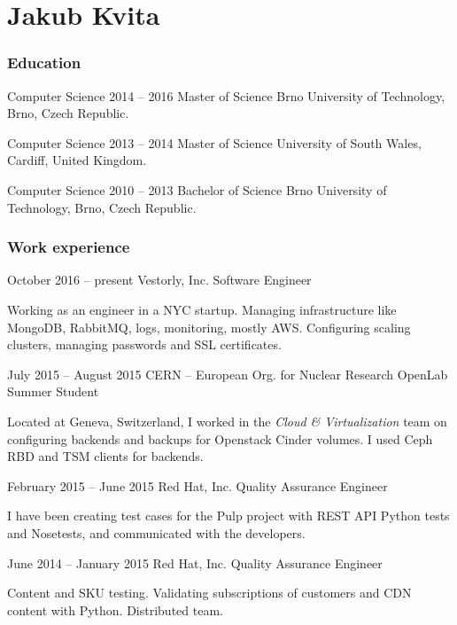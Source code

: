 \documentclass{tccv}
\begin{document}
\part{Jakub Kvita}

\section{Education}

\begin{yearlist}
	
	\item[Computer Science]{2014 -- 2016}
	{Master of Science}
	{Brno University of Technology, Brno, Czech Republic.}
	
	\item[Computer Science]{2013 -- 2014}
	{Master of Science}
	{University of South Wales, Cardiff, United Kingdom.}
	
	\item[Computer Science]{2010 -- 2013}
	{Bachelor of Science}
	{Brno University of Technology, Brno, Czech Republic.}
	
\end{yearlist}

\section{Work experience}

\begin{eventlist}

\item{October 2016 -- present}
{Vestorly, Inc.}
{Software Engineer}

Working as an engineer in a NYC startup. Managing infrastructure like MongoDB, RabbitMQ, logs, monitoring, mostly AWS. Configuring scaling clusters, managing passwords and SSL certificates.

\item{July 2015 -- August 2015}
     {CERN -- European Org. for Nuclear Research}
     {OpenLab Summer Student}

Located at Geneva, Switzerland, I worked in the \emph{Cloud \& Virtualization} team on configuring backends and backups for Openstack Cinder volumes. I used Ceph RBD and TSM clients for backends.

\item{February 2015 -- June 2015}
     {Red Hat, Inc.}
     {Quality Assurance Engineer}

I have been creating test cases for the Pulp project with REST API Python tests and Nosetests, and communicated with the developers.

\item{June 2014 -- January 2015}
     {Red Hat, Inc.}
     {Quality Assurance Engineer}

Content and SKU testing. Validating subscriptions of customers and CDN content with Python. Distributed team.

\end{eventlist}
\end{document}
